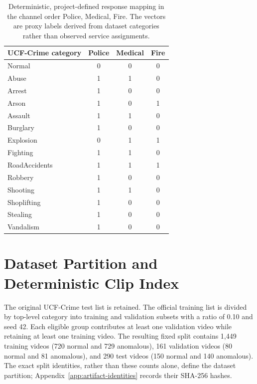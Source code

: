 \begin{table}[tbp]
    \centering
    \small
    \caption[Project-defined response mapping.]{Deterministic, project-defined response mapping in the channel order Police, Medical, Fire. The vectors are proxy labels derived from dataset categories rather than observed service assignments.}
    \label{tab:response-map}
    \begin{tabular}{@{}lccc@{}}
        \toprule
        \textbf{UCF-Crime category} & \textbf{Police} & \textbf{Medical} & \textbf{Fire} \\
        \midrule
        Normal        & 0 & 0 & 0 \\
        Abuse         & 1 & 1 & 0 \\
        Arrest        & 1 & 0 & 0 \\
        Arson         & 1 & 0 & 1 \\
        Assault       & 1 & 1 & 0 \\
        Burglary      & 1 & 0 & 0 \\
        Explosion     & 0 & 1 & 1 \\
        Fighting      & 1 & 1 & 0 \\
        RoadAccidents & 1 & 1 & 1 \\
        Robbery       & 1 & 0 & 0 \\
        Shooting      & 1 & 1 & 0 \\
        Shoplifting   & 1 & 0 & 0 \\
        Stealing      & 1 & 0 & 0 \\
        Vandalism     & 1 & 0 & 0 \\
        \bottomrule
    \end{tabular}
\end{table}

\section{Dataset Partition and Deterministic Clip Index}
\label{sec:data-protocol}

The original UCF-Crime test list is retained. The official training list is divided by top-level category into training and validation subsets with a ratio of 0.10 and seed 42. Each eligible group contributes at least one validation video while retaining at least one training video. The resulting fixed split contains 1,449 training videos (720 normal and 729 anomalous), 161 validation videos (80 normal and 81 anomalous), and 290 test videos (150 normal and 140 anomalous). The exact split identities, rather than these counts alone, define the dataset partition; Appendix~\ref{app:artifact-identities} records their SHA-256 hashes.

